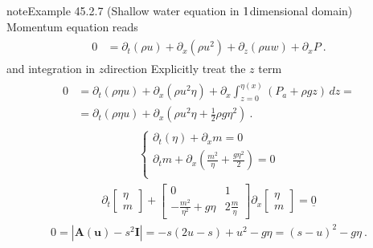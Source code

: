\documentclass[letterpaper,10pt,english]{jupyterBook}
\begin{document}
\begin{sphinxadmonition}{note}{Example 45.2.7 (Shallow water equation in \protect\(1\protect\)\sphinxhyphen{}dimensional domain)}
\sphinxAtStartPar
Momentum equation reads
\begin{equation*}
\begin{split}\begin{aligned}
  0
  & = \partial_t (\rho u) + \partial_x (\rho u^2) + \partial_z (\rho u w) + \partial_x P \ .
\end{aligned}\end{split}
\end{equation*}
\sphinxAtStartPar
and integration in \(z\)\sphinxhyphen{}direction  Explicitly treat the \(z\) term
\begin{equation*}
\begin{split}\begin{aligned}
  0
  & = \partial_t (\rho \eta u) + \partial_x (\rho u^2 \eta) + \partial_x \int_{z=0}^{\eta(x)} (P_a + \rho g z) \, dz = \\
  & = \partial_t (\rho \eta u) + \partial_x \left(\rho u^2 \eta + \frac{1}{2} \rho g \eta^2 \right)  \ .
\end{aligned}\end{split}
\end{equation*}
\sphinxAtStartPar
{}
\begin{equation*}
\begin{split}\begin{cases}
  \partial_t (\eta) + \partial_x m = 0 \\
  \partial_t m + \partial_x \left( \frac{m^2}{\eta} + \frac{g \eta^2}{2} \right) = 0 \\
\end{cases}\end{split}
\end{equation*}
\sphinxAtStartPar
{}
\begin{equation*}
\begin{split}
  \partial_t \begin{bmatrix} \eta \\ m \end{bmatrix} + \begin{bmatrix} 0 & 1 \\ -\frac{m^2}{\eta^2}+g\eta & 2 \frac{m}{\eta} \end{bmatrix} \partial_x \begin{bmatrix} \eta \\ m \end{bmatrix} = \underline{0}
\end{split}
\end{equation*}
\sphinxAtStartPar
{}
\begin{equation*}
\begin{split}0 = |\mathbf{A}(\mathbf{u}) - s^2 \mathbf{I}| = -s \left( 2 u - s \right) + u^2 - g \eta = (s-u)^2 - g  \eta \ .\end{split}
\end{equation*}\end{sphinxadmonition}
\end{document}
